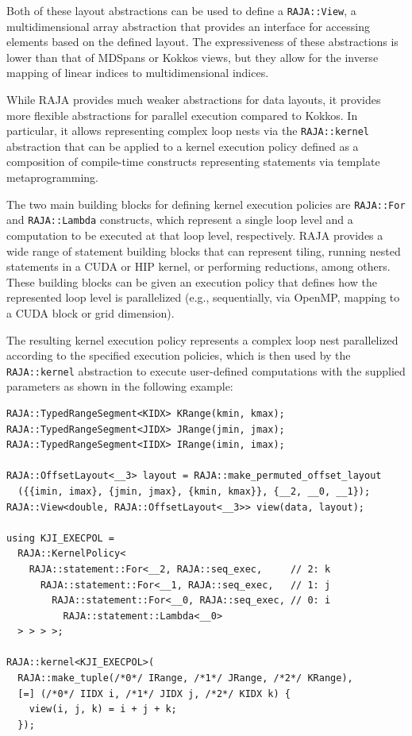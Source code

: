 Both of these layout abstractions can be used to define a \lstinline{RAJA::View}, a multidimensional array abstraction that provides an interface for accessing elements based on the defined layout. The expressiveness of these abstractions is lower than that of MDSpans or Kokkos views, but they allow for the inverse mapping of linear indices to multidimensional indices.

While RAJA provides much weaker abstractions for data layouts, it provides more flexible abstractions for parallel execution compared to Kokkos\@. In particular, it allows representing complex loop nests via the \lstinline{RAJA::kernel} abstraction that can be applied to a kernel execution policy defined as a composition of compile-time constructs representing statements via template metaprogramming.

The two main building blocks for defining kernel execution policies are \lstinline{RAJA::For} and \lstinline{RAJA::Lambda} constructs, which represent a single loop level and a computation to be executed at that loop level, respectively. RAJA provides a wide range of statement building blocks that can represent tiling, running nested statements in a CUDA or HIP kernel, or performing reductions, among others. These building blocks can be given an execution policy that defines how the represented loop level is parallelized (e.g., sequentially, via OpenMP, mapping to a CUDA block or grid dimension).

The resulting kernel execution policy represents a complex loop nest parallelized according to the specified execution policies, which is then used by the \lstinline{RAJA::kernel} abstraction to execute user-defined computations with the supplied parameters as shown in the following example:

\begin{lstlisting}[morekeywords={RAJA}]
RAJA::TypedRangeSegment<KIDX> KRange(kmin, kmax);
RAJA::TypedRangeSegment<JIDX> JRange(jmin, jmax);
RAJA::TypedRangeSegment<IIDX> IRange(imin, imax);

RAJA::OffsetLayout<__3> layout = RAJA::make_permuted_offset_layout
  ({{imin, imax}, {jmin, jmax}, {kmin, kmax}}, {__2, __0, __1});
RAJA::View<double, RAJA::OffsetLayout<__3>> view(data, layout);

using KJI_EXECPOL =
  RAJA::KernelPolicy<
    RAJA::statement::For<__2, RAJA::seq_exec,     // 2: k
      RAJA::statement::For<__1, RAJA::seq_exec,   // 1: j
        RAJA::statement::For<__0, RAJA::seq_exec, // 0: i
          RAJA::statement::Lambda<__0>
  > > > >;

RAJA::kernel<KJI_EXECPOL>(
  RAJA::make_tuple(/*0*/ IRange, /*1*/ JRange, /*2*/ KRange),
  [=] (/*0*/ IIDX i, /*1*/ JIDX j, /*2*/ KIDX k) {
    view(i, j, k) = i + j + k;
  });
\end{lstlisting}

